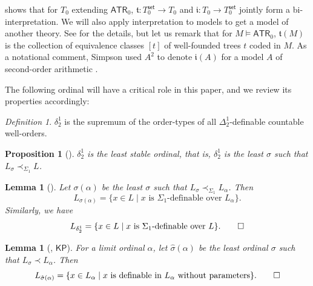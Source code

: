 \documentclass{amsart}
\newtheorem{lemma}[theorem]{Lemma}
\newtheorem{proposition}[proposition]{Proposition}
\theoremstyle{remark}
\newtheorem{definition}[definition]{Definition}
\newcommand{\fraki}{\mathfrak{i}}
\newcommand{\frakt}{\mathfrak{t}}
\newcommand{\ATR}{\mathsf{ATR}}
\newcommand{\KP}{\mathsf{KP}}
\newcommand{\set}{\mathsf{set}}
\begin{document}
\cite[Theorem VII.3.34]{simpson2009subsystems} shows that for $T_0$ extending $\ATR_0$, $\frakt\colon T_0^\set\to T_0$ and $\fraki\colon T_0\to T_0^\set$ jointly form a bi-interpretation.
We will also apply interpretation to models to get a model of another theory. See \cite[Definition VII.3.28]{simpson2009subsystems} for the details, but let us remark that for $M\vDash \ATR_0$, $\frakt(M)$ is the collection of equivalence classes $[t]$ of well-founded trees $t$ coded in $M$.
As a notational comment, Simpson used $A^2$ to denote $\fraki(A)$ for a model $A$ of second-order arithmetic \cite[Definition VI.3.26]{simpson2009subsystems}.

The following ordinal will have a critical role in this paper, and we review its properties accordingly:
\begin{definition}
    $\delta^1_2$ is the supremum of the order-types of all $\Delta^1_2$-definable countable well-orders.
\end{definition}

\begin{proposition}[{\cite[Corollary V.8.3]{Barwise1975}}] \pushQED{\qed}
    $\delta^1_2$ is the least stable ordinal, that is, $\delta^1_2$ is the least $\sigma$ such that $L_\sigma\prec_{\Sigma_1} L$. \qedhere 
\end{proposition}

\begin{lemma}[{\cite[Theorem V.7.8]{Barwise1975}}] \label{Lemma: Characterizing stable ordinals} \pushQED{\qed}
    Let $\sigma(\alpha)$ be the least $\sigma$ such that $L_\sigma\prec_{\Sigma_1} L_\alpha$. Then
    \begin{equation*}
        L_{\sigma(\alpha)} = \{x\in L \mid x\text{ is $\Sigma_1$-definable over }L_\alpha \}.
\end{equation*}
Similarly, we have
\begin{equation*}
    L_{\delta^1_2} = \{x\in L \mid x\text{ is $\Sigma_1$-definable over }L\}. \qedhere 
\end{equation*} 
\end{lemma}

\begin{lemma}[{\cite[Lemma II.5.3]{Devlin1984Constructibility}}, $\KP$] \pushQED{\qed} \label{Lemma: Characterizing full stable ordinals}
    For a limit ordinal $\alpha$, let $\hat{\sigma}(\alpha)$ be the least ordinal $\sigma$ such that $L_\sigma \prec L_\alpha$.
    Then
    \begin{equation*}
        L_{\hat{\sigma}(\alpha)} = \{x\in L_\alpha\mid \text{$x$ is definable in $L_\alpha$ without parameters}\}. \qedhere 
    \end{equation*}
\end{lemma}
\end{document}
